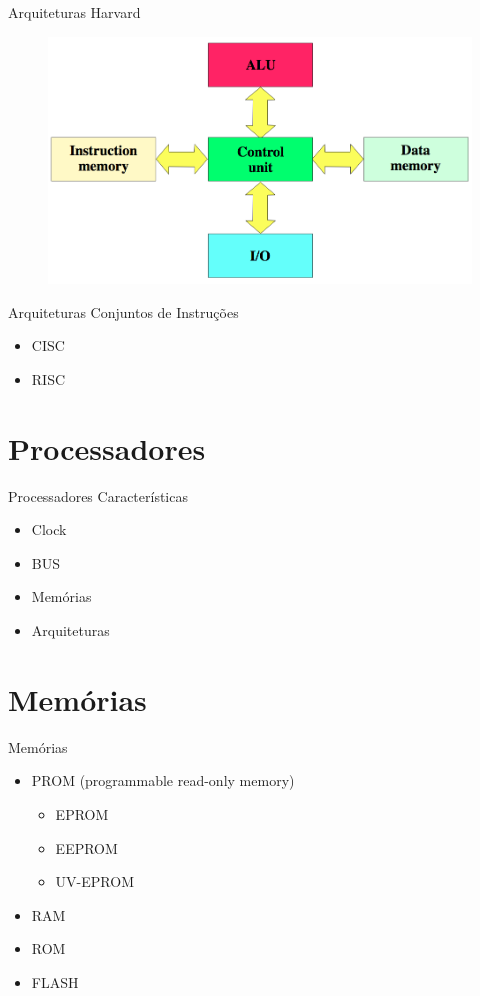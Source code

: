\documentclass[t]{beamer}
\begin{document}
\begin{frame}{Arquiteturas}
Harvard

\begin{figure}
\includegraphics[width=\linewidth]{arquiteturaharvard}
\end{figure}
\end{frame}

\begin{frame}{Arquiteturas}
Conjuntos de Instruções
\begin{itemize}
\item CISC
\item RISC
\end{itemize}
\end{frame}

\section{Processadores}

\begin{frame}{Processadores}
Características
\begin{itemize}
	\item Clock
	\item BUS
	\item Memórias
	\item Arquiteturas
\end{itemize}
\end{frame}

\section{Memórias}

\begin{frame}{Memórias}
\begin{itemize}
	\item PROM (programmable read-only memory)
	\begin{itemize}
		\item EPROM
		\item EEPROM
		\item UV-EPROM
	\end{itemize}
	\item RAM
	\item ROM
	\item FLASH
\end{itemize}
\end{frame}
\end{document}
